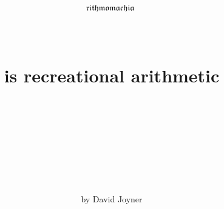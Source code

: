 \documentclass[14pt]{extarticle}
\def\rithmomachia{$\frak{rithmomachia}\ $}
\begin{document}
\author{\normalsize by David Joyner}
\title{ \quad \\ \quad \\ \quad \\ \quad \\
  {\Huge{\bf \rithmomachia}}\\
  \quad \\\quad \\
  is recreational arithmetic\quad \\ \quad \\ \quad \\ \quad \\ \quad \\}
\date{ }
\pagestyle{empty}

\maketitle

\pagestyle{plain}

\newpage



\end{document}

